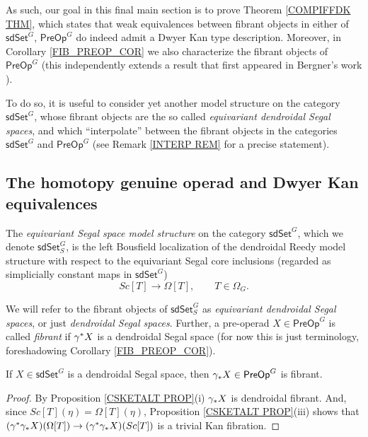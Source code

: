 \documentclass[a4paper,10pt
]{article}%
\begin{document}
As such, our goal in this final main section is to prove
Theorem \ref{COMPIFFDK THM},
which states that weak equivalences between fibrant objects in either of 
$\mathsf{sdSet}^G$, $\mathsf{PreOp}^G$
do indeed admit a Dwyer Kan type description.
Moreover, in Corollary \ref{FIB_PREOP_COR} we also characterize the fibrant objects of $\mathsf{PreOp}^G$
(this independently extends a result that first appeared in Bergner's work \cite{Ber07}).

To do so, it is useful to consider yet another model structure on the category $\mathsf{sdSet}^G$,
whose fibrant objects are the so called
\textit{equivariant dendroidal Segal spaces},
and which ``interpolate''
between the fibrant objects 
in the categories $\mathsf{sdSet}^G$ and $\mathsf{PreOp}^G$ (see Remark \ref{INTERP REM} for a precise statement).




\subsection{The homotopy genuine operad and Dwyer Kan equivalences}\label{HMPTYGEN SEC}


\begin{definition}
	The \textit{equivariant Segal space model structure} on the category $\mathsf{sdSet}^G$, which we denote 
	$\mathsf{sdSet}^G_S$, 
	is the left Bousfield localization of the dendroidal Reedy model structure with respect to the equivariant Segal core inclusions 
	(regarded as simplicially constant maps in $\mathsf{sdSet}^G$)
\[
	Sc[T] \to \Omega[T], \qquad T \in \Omega_G.
\]
\end{definition}


\begin{notation}\label{FIB_PREOP_NOT}
We will refer to the fibrant objects of
$\mathsf{sdSet}^G_S$
as \textit{equivariant dendroidal Segal spaces}, 
or just \textit{dendroidal Segal spaces}.
Further, a pre-operad $X \in \mathsf{PreOp}^G$ is called \textit{fibrant}
if $\gamma^{\**}X$ is a dendroidal Segal space
(for now this is just terminology,
foreshadowing Corollary \ref{FIB_PREOP_COR}).
\end{notation}


\begin{proposition}
If $X \in \mathsf{sdSet}^G$ is a dendroidal Segal space, then
$\gamma_{\**}X \in \mathsf{PreOp}^G$ is fibrant.
\end{proposition}

\begin{proof}
	By Proposition \ref{CSKETALT PROP}(i) $\gamma_{\**}X$ is dendroidal fibrant. And, since 
	$Sc[T](\eta)=\Omega[T](\eta)$,
	Proposition \ref{CSKETALT PROP}(iii) shows that 
	$(\gamma^{\**}\gamma_{\**}X)(\Omega[T]) \to 
	(\gamma^{\**} \gamma_{\**}X)(Sc[T])$
	is a trivial Kan fibration.
\end{proof}
\end{document}
